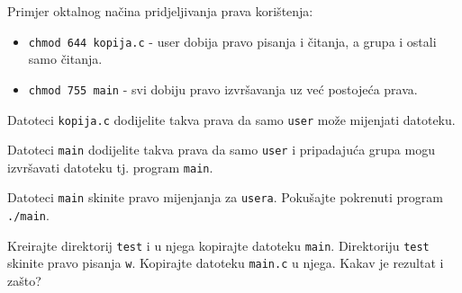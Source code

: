 \begin{primjer}Primjer oktalnog načina pridjeljivanja prava korištenja:
\begin{itemize}
 \item \texttt{chmod 644 kopija.c} - user dobija pravo pisanja i čitanja, a grupa i ostali samo čitanja.
\item \texttt{chmod 755 main} - svi dobiju pravo izvršavanja uz već postojeća prava.
\end{itemize}
\end{primjer}
\begin{zadatak}
Datoteci \texttt{kopija.c} dodijelite takva prava da samo \texttt{user} može mijenjati datoteku. 
\end{zadatak}
\begin{zadatak}
Datoteci \texttt{main} dodijelite takva prava da samo \texttt{user} i pripadajuća grupa mogu izvršavati datoteku tj. program \texttt{main}. 
\end{zadatak}
\begin{zadatak}
Datoteci \texttt{main} skinite pravo mijenjanja za \texttt{usera}. Pokušajte pokrenuti program \texttt{./main}. 
\end{zadatak}
\begin{zadatak}
Kreirajte direktorij \texttt{test} i u njega kopirajte datoteku \texttt{main}. Direktoriju \texttt{test} skinite pravo pisanja \texttt{w}. 
Kopirajte datoteku \texttt{main.c} u njega. Kakav je rezultat i zašto? 
\end{zadatak}

\begin{comment}

\vfill
\begin{itemize}
\renewcommand{\labelitemi}{\textbf{$\rightarrow$}}
\item Popis svih pokrenutih naredbi eksportirajte u datoteku imena \texttt{prezime\_ime\_vj7.txt}. Uploadajte datoteku na \href{https://moodle.oss.unist.hr/course/view.php?id=133}{http://moodle.oss.unist.hr}.
\end{itemize}

\end{comment}
